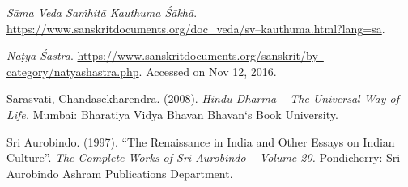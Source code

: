 \begin{thebibliography}{99}
  \textit{Sāma Veda Saṁhitā Kauthuma Śākhā}. \url{https://www.sanskritdocuments.org/doc_veda/sv–kauthuma.html?lang=sa}.

  \textit{Nāṭya Śāstra}. \url{https://www.sanskritdocuments.org/sanskrit/by–category/natyashastra.php}. Accessed on Nov 12, 2016.

  Sarasvati, Chandasekharendra. (2008). \textit{Hindu Dharma – The Universal Way of Life.} Mumbai: Bharatiya Vidya Bhavan Bhavan‘s Book University.

  Sri Aurobindo. (1997). “The Renaissance in India and Other Essays on Indian Culture”. \textit{The Complete Works of Sri Aurobindo – Volume 20.} Pondicherry: Sri Aurobindo Ashram Publications Department.

 \end{thebibliography}


